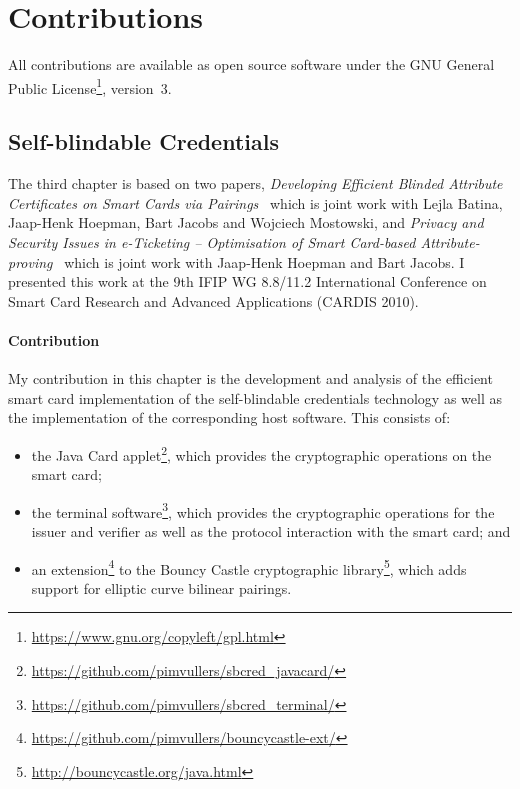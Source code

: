 \section{Contributions}

All contributions are available as open source software under the GNU General
Public License\footnote{\url{https://www.gnu.org/copyleft/gpl.html}}, version~3.

\subsection{Self-blindable Credentials}

The third chapter is based on two papers, \emph{Developing Efficient Blinded
Attribute Certificates on Smart Cards via Pairings}~\cite{BatinaHJMV10} which
is joint work with Lejla Batina, Jaap-Henk Hoepman, Bart Jacobs and Wojciech
Mostowski, and \emph{Privacy and Security Issues in e-Ticketing -- Optimisation
of Smart Card-based Attribute-proving}~\cite{HoepmanJV10} which is joint work
with Jaap-Henk Hoepman and Bart Jacobs. I presented this work at the 9th IFIP WG
8.8/11.2 International Conference on Smart Card Research and Advanced
Applications (CARDIS 2010).

\paragraph{Contribution}

My contribution in this chapter is the development and analysis of the efficient
smart card implementation of the self-blindable credentials technology as well
as the implementation of the corresponding host software. This consists of:
\begin{itemize}
  \item the Java Card applet\footnote{\url{https://github.com/pimvullers/sbcred_javacard/}},
    which provides the cryptographic operations on the smart card;
  \item the terminal software\footnote{\url{https://github.com/pimvullers/sbcred_terminal/}},
    which provides the cryptographic operations for the issuer and verifier as
    well as the protocol interaction with the smart card; and
  \item an extension\footnote{\url{https://github.com/pimvullers/bouncycastle-ext/}}
    to the Bouncy Castle cryptographic library\footnote{\url{http://bouncycastle.org/java.html}},
    which adds support for elliptic curve bilinear pairings.
\end{itemize}

